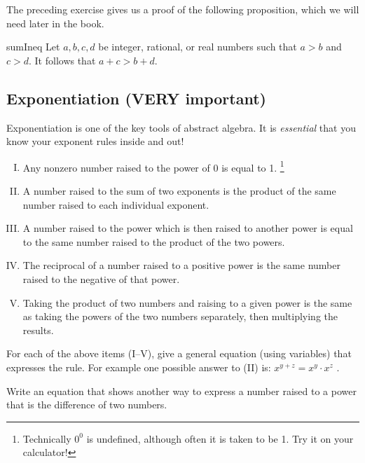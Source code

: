 The preceding exercise gives us a proof of the following proposition, which we will need later in the book.

\begin{prop}{sumIneq}
Let $a,b,c,d$ be integer, rational, or real numbers such that $a>b$ and $c>d$.  It follows that  $a+c > b+d$.
\end{prop}

%
%

\subsection {Exponentiation (VERY important)}

Exponentiation is one of the key tools of abstract algebra. It is \emph{essential} that you know your exponent rules inside and out!  

\begin{enumerate}[(I)]
\item
Any nonzero number raised to the power of 0 is equal to 1.
\footnote{ Technically $0^0$ is undefined, although often it is taken to be 1. Try it on your calculator!}
\item
A number raised to the sum of two exponents  is the product of the same number raised to each individual exponent.
\item
A number raised to the power which is then raised to another power is equal to the same number raised to the product of the two powers.
\item
The reciprocal of a number raised to a positive power is the same number raised to the negative of that power.
\item
Taking the  product of two numbers  and raising to a given power is the same as taking the powers of the two numbers separately, then multiplying the results.
\end{enumerate}

\begin{exercise}{5}
For each of the above items (I--V),  give a general equation (using variables) that expresses the rule.  For example one possible answer to (II) is:  $x^{y+z} = x^y \cdot x^z$ .
\end{exercise}
\begin{exercise}{6}
Write an equation that shows another way to express a number raised to a power that is the difference of two numbers.
\end{exercise}

